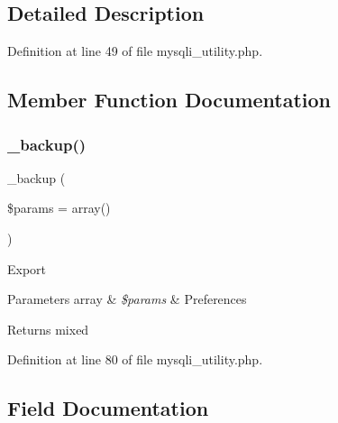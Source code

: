\subsection{Detailed Description}


Definition at line 49 of file mysqli\+\_\+utility.\+php.



\subsection{Member Function Documentation}
\mbox{\label{class_c_i___d_b__mysqli__utility_a30f3053d2c82e7562349924363507afa}} 
\subsubsection{\texorpdfstring{\_backup()}{\_backup()}}
{\footnotesize\ttfamily \+\_\+backup (\begin{DoxyParamCaption}\item[{}]{\$params = {\ttfamily array()} }\end{DoxyParamCaption})\hspace{0.3cm}{\ttfamily [protected]}}

Export


\begin{DoxyParams}[1]{Parameters}
array & {\em \$params} & Preferences \\
\hline
\end{DoxyParams}
\begin{DoxyReturn}{Returns}
mixed 
\end{DoxyReturn}


Definition at line 80 of file mysqli\+\_\+utility.\+php.



\subsection{Field Documentation}
\mbox{\label{class_c_i___d_b__mysqli__utility_afe3a5b80562d93d6bc7e2b53c95b7e5a}} 
